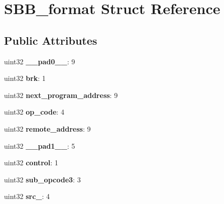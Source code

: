\hypertarget{structSBB__format}{}\section{S\+B\+B\+\_\+format Struct Reference}
\label{structSBB__format}
\subsection*{Public Attributes}
\begin{DoxyCompactItemize}
\item 
\mbox{\label{structSBB__format_a7ea3ce19b89dcd6bc8f34c9e09bff005}} 
uint32 {\bfseries \+\_\+\+\_\+pad0\+\_\+\+\_\+}\+: 9
\item 
\mbox{\label{structSBB__format_abd98e8b2519b9f221db81bfed5c72b6e}} 
uint32 {\bfseries brk}\+: 1
\item 
\mbox{\label{structSBB__format_a0d0db55b902e67238a7c0cde7a43f895}} 
uint32 {\bfseries next\+\_\+program\+\_\+address}\+: 9
\item 
\mbox{\label{structSBB__format_a6862a0a63960852b4e1d6590b9f68b71}} 
uint32 {\bfseries op\+\_\+code}\+: 4
\item 
\mbox{\label{structSBB__format_a4abb2ee0ad39d4b88fce1992a330ef41}} 
uint32 {\bfseries remote\+\_\+address}\+: 9
\item 
\mbox{\label{structSBB__format_a792b7e2a06ac87f85a1dda0ab0335f5b}} 
uint32 {\bfseries \+\_\+\+\_\+pad1\+\_\+\+\_\+}\+: 5
\item 
\mbox{\label{structSBB__format_a19f0caf0ba8db627549b82fa035fbba6}} 
uint32 {\bfseries control}\+: 1
\item 
\mbox{\label{structSBB__format_ad3be514b2e648ab3de1288b392831831}} 
uint32 {\bfseries sub\+\_\+opcode3}\+: 3
\item 
\mbox{\label{structSBB__format_a8a1d630b4d7d008f0c37a2ca9628af56}} 
uint32 {\bfseries src\+\_}\+: 4
\item 

\end{DoxyCompactItemize}
